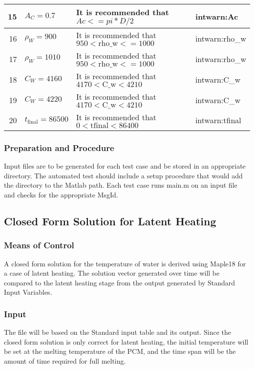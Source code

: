 \documentclass[12pt]{article}
\begin{document}
\begin{center}
\begin{longtable}{ | r | p{3cm} | p{5cm} | p{4cm} |}
          15 & $A_C = 0.7$ & It is recommended that $Ac <= pi*D/2$ & intwarn:Ac\\ \hline
          16 & $\rho_W = 900$ & It is recommended that $950 < \text{rho\_{w}} <= 1000$ & intwarn:rho\_{w} \\ \hline
          17 & $\rho_W = 1010$ & It is recommended that $950 < \text{rho\_{w}} <= 1000$ & intwarn:rho\_{w} \\ \hline
          18 & $C_W = 4160$ & It is recommended that $4170 < \text{C\_{w}} < 4210$ & intwarn:C\_{w} \\ \hline
          19 & $C_W = 4220$ & It is recommended that $4170 < \text{C\_{w}} < 4210$ & intwarn:C\_{w} \\ \hline
          20 & $t_{\text{final}} = 86500$ & It is recommended that $0 < \text{tfinal} < 86400$ & intwarn:tfinal \\ \hline
	\end{longtable}
\end{center}

\subsubsection{Preparation and Procedure}
Input files are to be generated for each test case and be stored in an
appropriate directory. The automated test should include a setup procedure that
would add the directory to the Matlab path. Each test case runs main.m on an
input file and checks for the appropriate MsgId.

\subsection{Closed Form Solution for Latent Heating}
\subsubsection{Means of Control}
A closed form solution for the temperature of water is derived using Maple18 for
a case of latent heating. The solution vector generated over time will be
compared to the latent heating stage from the output generated by Standard Input
Variables.
\subsubsection{Input}
The file will be based on the Standard input table and its output. Since the
closed form solution is only correct for latent heating, the initial temperature
will be set at the melting temperature of the PCM, and the time span will be the
amount of time required for full melting.
\end{document}
